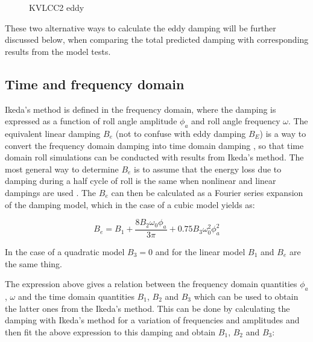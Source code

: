     \begin{figure}
        \begin{center}\end{center}
        \caption{KVLCC2 eddy}
        \label{fig:kvlcc2_eddy}
    \end{figure}
    
    These two alternative ways to calculate the eddy damping will be further
discussed below, when comparing the total predicted damping with
corresponding results from the model tests.

    \subsection{Time and frequency domain}\label{time-and-frequency-domain}

Ikeda's method is defined in the frequency domain, where the damping is
expressed as a function of roll angle amplitude \(\phi_a\) and roll
angle frequency \(\omega\). The equivalent linear damping \(B_e\) (not
to confuse with eddy damping \(B_E\)) is a way to convert the frequency
domain damping into time domain damping \cite{7505983/FB64RGPF}, so that
time domain roll simulations can be conducted with results from Ikeda's
method. The most general way to determine \(B_e\) is to assume that the
energy loss due to damping during a half cycle of roll is the same when
nonlinear and linear dampings are used \cite{7505983/RYUBZITQ}. The
\(B_e\) can then be calculated as a Fourier series expansion of the
damping model, which in the case of a cubic model yields as:
 
            
    
    \begin{equation}
B_{e} = B_{1} + \frac{8 B_{2} \omega_{0} \phi_{a}}{3 \pi} + 0.75 B_{3} \omega_{0}^{2} \phi_{a}^{2}
\label{eq:equation}
\end{equation}

    

    In the case of a quadratic model \(B_3=0\) and for the linear model
\(B_1\) and \(B_e\) are the same thing.

    The expression above gives a relation between the frequency domain
quantities \(\phi_a\), \(\omega\) and the time domain quantities
\(B_1\), \(B_2\) and \(B_3\) which can be used to obtain the latter ones
from the Ikeda's method. This can be done by calculating the damping
with Ikeda's method for a variation of frequencies and amplitudes and
then fit the above expression to this damping and obtain \(B_1\),
\(B_2\) and \(B_3\):

